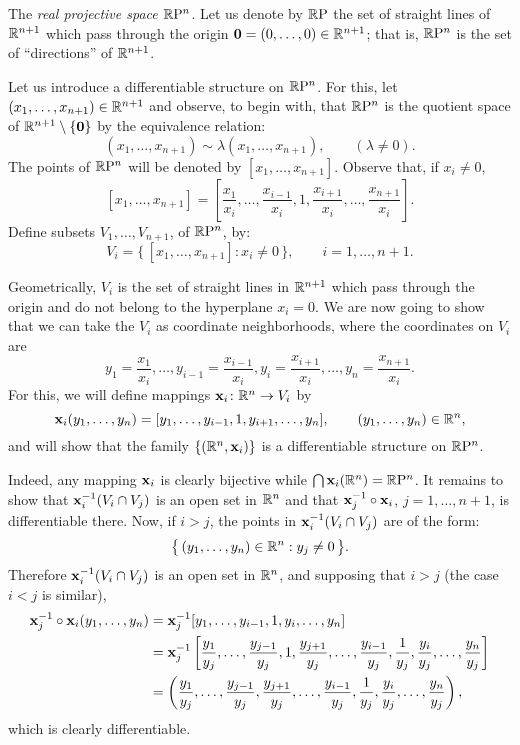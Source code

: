 \begin{example}
  The \emph{real projective space \(\mathbb{R}\mathrm{P}^n\)}. Let us denote by
  \(\mathbb{R}\mathrm{P}\) the set of straight lines of \(\mathbb{R}^{n+1}\) which pass
  through the origin \(\mathbf{0}=(0,\dotsc,0)\in\mathbb{R}^{n+1}\); that is,
  \(\mathbb{R}\mathrm{P}^n\) is the set of ``directions'' of \(\mathbb{R}^{n+1}\).

  Let us introduce a differentiable structure on \(\mathbb{R}\mathrm{P}^n\). For this,
  let \((x_1,\dotsc,x_{n+1})\in\mathbb{R}^{n+1}\) and observe, to begin with,
  that \(\mathbb{R}\mathrm{P}^n\) is the quotient space of
  \(\mathbb{R}^{n+1}\setminus\{\mathbf{0}\}\) by the equivalence relation:
  \[
    (x_1,\dotsc,x_{n+1})\sim\lambda(x_1,\dotsc,x_{n+1}), \qquad
    (\lambda\neq 0).
  \]
  The points of \(\mathbb{R}\mathrm{P}^n\) will be denoted by
  \([x_1,\dotsc,x_{n+1}]\). Observe that, if \(x_i\neq 0\),
  \[
    [x_1,\dotsc,x_{n+1}]=
    \left[\frac{x_1}{x_i},\dotsc,\frac{x_{i-1}}{x_i},1,\frac{x_{i+1}}{x_i},\dotsc,\frac{x_{n+1}}{x_i}\right].
  \]
  Define subsets \(V_1,\dotsc,V_{n+1}\), of \(\mathbb{R}\mathrm{P}^n\), by:
  \[
    V_i=\bigl\{\,[x_1,\dotsc,x_{n+1}]:x_i\neq 0\,\bigr\},\qquad i=1,\dotsc,n+1.
  \]

  Geometrically, \(V_i\) is the set of straight lines in \(\mathbb{R}^{n+1}\)
  which pass through the origin and do not belong to the hyperplane
  \(x_i=0\). We are now going to show that we can take the \(V_i\) as
  coordinate neighborhoods, where the coordinates on \(V_i\) are
  \[
    y_1=\frac{x_1}{x_i},\dotsc,y_{i-1}=\frac{x_{i-1}}{x_i},
    y_i=\frac{x_{i+1}}{x_i},\dotsc,y_n=\frac{x_{n+1}}{x_i}.
  \]
  For this, we will define mappings \(\mathbf{x}_i\colon\mathbb{R}^n\to V_i\) by
  \[
    \mathbf{x}_i(y_1,\dotsc,y_n)=[y_1,\dotsc,y_{i-1},1,y_{i+1},\dotsc,y_n]
    ,\qquad (y_1,\dotsc,y_n)\in\mathbb{R}^n,
  \]
  and will show that the family \(\{(\mathbb{R}^n,\mathbf{x}_i)\}\) is a differentiable
  structure on \(\mathbb{R}\mathrm{P}^n\).

  Indeed, any mapping \(\mathbf{x}_i\) is clearly bijective while
  \(\bigcap\mathbf{x}_i(\mathbb{R}^n)=\mathbb{R}\mathrm{P}^n\). It remains to show that
  \(\mathbf{x}_i^{-1}(V_i\cap V_j)\) is an open set in \(\mathbb{R}^n\) and that
  \(\mathbf{x}_j^{-1}\circ\mathbf{x}_i\), \(j=1,\dotsc,n+1\), is differentiable
  there. Now, if \(i>j\), the points in \(\mathbf{x}_i^{-1}(V_i\cap V_j)\) are of
  the form:
  \[
    \bigl\{\,(y_1,\dotsc,y_n)\in\mathbb{R}^n:y_j\neq 0\,\bigr\}.
  \]
  Therefore \(\mathbf{x}_i^{-1}(V_i\cap V_j)\) is an open set in \(\mathbb{R}^n\), and
  supposing that \(i>j\) (the case \(i<j\) is similar),
  \begin{align*}
    \mathbf{x}_j^{-1}\circ\mathbf{x}_i(y_1,\dotsc,y_n)
    &=\mathbf{x}_j^{-1}[y_1,\dotsc,y_{i-1},1,y_i,\dotsc,y_n]\\
    &=\mathbf{x}_j^{-1}\left[\frac{y_1}{y_j},\dotsc,\frac{y_{j-1}}{y_j},1,
      \frac{y_{j+1}}{y_j},\dotsc,\frac{y_{i-1}}{y_j},\frac{1}{y_j},
      \frac{y_i}{y_j},\dotsc,\frac{y_n}{y_j}\right]\\
    &=\left(\frac{y_1}{y_j},\dotsc,\frac{y_{j-1}}{y_j},\frac{y_{j+1}}{y_j},
      \dotsc,\frac{y_{i-1}}{y_j},\frac{1}{y_j},\frac{y_i}{y_j},\dotsc,
      \frac{y_n}{y_j}\right),
  \end{align*}
  which is clearly differentiable.
\end{example}


